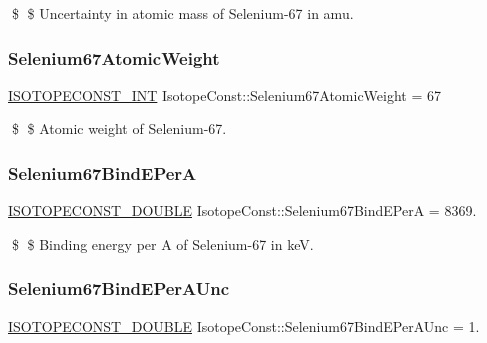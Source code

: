 \$ \$ Uncertainty in atomic mass of Selenium-\/67 in amu. \mbox{\label{group___isotope_const-_selenium-_se67_gad2b77d3e1f67bce9460ad27ced8c9e40}} 
\subsubsection{\texorpdfstring{Selenium67\+Atomic\+Weight}{Selenium67AtomicWeight}}
{\footnotesize\ttfamily \mbox{\hyperlink{group___isotope_const-_macros_ga5f18360b3e99483a35c32d789e62621c}{I\+S\+O\+T\+O\+P\+E\+C\+O\+N\+S\+T\+\_\+\+I\+NT}} Isotope\+Const\+::\+Selenium67\+Atomic\+Weight = 67}

\$ \$ Atomic weight of Selenium-\/67. \mbox{\label{group___isotope_const-_selenium-_se67_gabd325c05c4d8025c04df7a3a68723559}} 
\subsubsection{\texorpdfstring{Selenium67\+Bind\+E\+PerA}{Selenium67BindEPerA}}
{\footnotesize\ttfamily \mbox{\hyperlink{group___isotope_const-_macros_ga8f45a7272ce02c0b4c65c44636ed719a}{I\+S\+O\+T\+O\+P\+E\+C\+O\+N\+S\+T\+\_\+\+D\+O\+U\+B\+LE}} Isotope\+Const\+::\+Selenium67\+Bind\+E\+PerA = 8369.}

\$ \$ Binding energy per A of Selenium-\/67 in keV. \mbox{\label{group___isotope_const-_selenium-_se67_gaf368558131f019a182b4f9ca62d3860c}} 
\subsubsection{\texorpdfstring{Selenium67\+Bind\+E\+Per\+A\+Unc}{Selenium67BindEPerAUnc}}
{\footnotesize\ttfamily \mbox{\hyperlink{group___isotope_const-_macros_ga8f45a7272ce02c0b4c65c44636ed719a}{I\+S\+O\+T\+O\+P\+E\+C\+O\+N\+S\+T\+\_\+\+D\+O\+U\+B\+LE}} Isotope\+Const\+::\+Selenium67\+Bind\+E\+Per\+A\+Unc = 1.}

